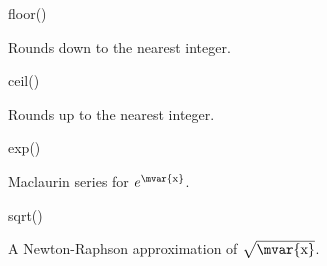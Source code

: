 \begin{math-function}{floor()}

	Rounds  down to the nearest integer. 
	
\begin{codeexample}[post=\tt\footnotesize\pgfmathresult]
\end{codeexample}

\begin{codeexample}[post=\tt\footnotesize\pgfmathresult]
\end{codeexample}

\end{math-function}

\begin{math-function}{ceil()}

	Rounds  up to the nearest integer. 

\begin{codeexample}[post=\tt\footnotesize\pgfmathresult]
\end{codeexample}

\begin{codeexample}[post=\tt\footnotesize\pgfmathresult]
\end{codeexample}

\end{math-function}

\begin{math-function}{exp()}

	Maclaurin series for $e^\textrm{\mvar{x}}$. 
	
\begin{codeexample}[post=\tt\footnotesize\pgfmathresult]
\end{codeexample}

\begin{codeexample}[post=\tt\footnotesize\pgfmathresult]
\end{codeexample}

\end{math-function}

\begin{math-function}{sqrt()}

 A Newton-Raphson approximation of $\sqrt{\textrm{\mvar{x}}}$.  

\begin{codeexample}[post=\tt\footnotesize\pgfmathresult]
\end{codeexample}

\begin{codeexample}[post=\tt\footnotesize\pgfmathresult]
\end{codeexample}


\end{math-function}


